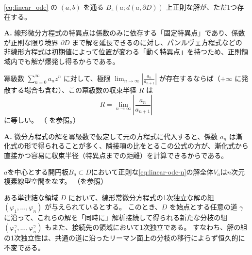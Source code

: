\begin{corollary}\label{cor:linear_maximal_disk}
    \eqref{eq:linear_ode} の $(a,b)$ を通る $B_{z}(a;d(a,\partial D))$ 上正則な解が、ただ1つ存在する。
\end{corollary}

\begin{Q}
\textbf{A.} 線形微分方程式の特異点は係数のみに依存する「固定特異点」であり、係数が正則な限り境界 $\partial D$ まで解を延長できるのに対し、パンルヴェ方程式などの非線形方程式は初期値によって位置が変わる「動く特異点」を持つため、正則領域内でも解が爆発し得るからである。
\end{Q}
\begin{proposition}\label{prop:dalembert_radius}
    冪級数 $\sum_{n=0}^{\infty}a_{n}z^{n}$ に対して、極限 $\lim_{n\to\infty}\left|\frac{a_{n}}{a_{n+1}}\right|$ が存在するならば（$+\infty$ に発散する場合も含む）、この冪級数の収束半径 $R$ は
    \begin{equation}
        R = \lim_{n\to\infty}\left|\frac{a_{n}}{a_{n+1}}\right|
    \end{equation}
    に等しい。
    （\cite[p.33 定理2.4.4]{book:noguchi} を参照。）
\end{proposition}

\begin{Q}
\textbf{A.} 微分方程式の解を冪級数で仮定して元の方程式に代入すると、係数 $a_n$ は漸化式の形で得られることが多く、隣接項の比をとるこの公式の方が、漸化式から直接かつ容易に収束半径（特異点までの距離）を計算できるからである。
\end{Q}
\begin{theorem}\label{thm:solution_space_dimension}
    $a$を中心とする開円板$B_{a}\subset D$において正則な\eqref{eq:linear-ode-n}の解全体$V_{a}$は$n$次元複素線型空間をなす。
    （\cite[p.78 定理11.2]{book:takano}を参照）
\end{theorem}
\begin{proposition}\label{prop:independence_branch_invariance}
    ある単連結な領域 $D$ において、線形常微分方程式の1次独立な解の組 $(\varphi_1, \dots, \varphi_n)$ が与えられているとする。
    このとき、$D$ を始点とする任意の道 $\gamma$ に沿って、これらの解を「同時に」解析接続して得られる新たな分枝の組 $(\varphi_1^\gamma, \dots, \varphi_n^\gamma)$ もまた、接続先の領域において1次独立である。
    すなわち、解の組の1次独立性は、共通の道に沿ったリーマン面上の分枝の移行によらず恒久的に不変である。
\end{proposition}

